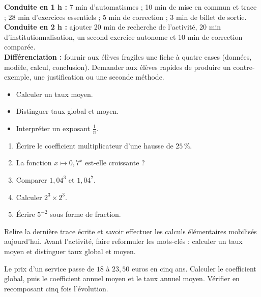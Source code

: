 \ifprof
\begin{methode}
\textbf{Conduite en 1 h :} 7 min d'automatismes ; 10 min de mise en commun et trace ; 28 min d'exercices essentiels ; 5 min de correction ; 3 min de billet de sortie.\\
\textbf{Conduite en 2 h :} ajouter 20 min de recherche de l'activité, 20 min d'institutionnalisation, un second exercice autonome et 10 min de correction comparée.\\
\textbf{Différenciation :} fournir aux élèves fragiles une fiche à quatre cases (données, modèle, calcul, conclusion). Demander aux élèves rapides de produire un contre-exemple, une justification ou une seconde méthode.
\end{methode}
\fi
{}
\begin{objectifs}\begin{itemize}\item Calculer un taux moyen.\item Distinguer taux global et moyen.\item Interpréter un exposant $\frac1n$.\end{itemize}\end{objectifs}
\begin{automatismes}\begin{enumerate}\item Écrire le coefficient multiplicateur d'une hausse de $25\,\%$. \item La fonction $x\mapsto0{,}7^x$ est-elle croissante ? \item Comparer $1{,}04^3$ et $1{,}04^7$. \item Calculer $2^3\times2^3$. \item Écrire $5^{-2}$ sous forme de fraction. \end{enumerate}\end{automatismes}
\begin{prerequis}Relire la dernière trace écrite et savoir effectuer les calculs élémentaires mobilisés aujourd'hui. Avant l'activité, faire reformuler les mots-clés : calculer un taux moyen et distinguer taux global et moyen.\end{prerequis}

\begin{activite}
Le prix d'un service passe de $18$ à $23{,}50$ euros en cinq ans. Calculer le coefficient global, puis le coefficient annuel moyen et le taux annuel moyen. Vérifier en recomposant cinq fois l'évolution.

\end{activite}

